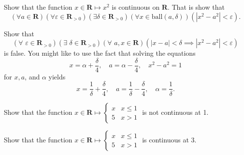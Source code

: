 \documentclass[12pt,answers,fleqn]{exam}
\newcommand{\reals}{\mathbf{R}}
\newcommand{\ball}{\mathrm{ball}}
\begin{document}
\begin{questions} 

\question[5] Show that the function $x \in \reals \mapsto x^2$ is continuous 
on $\reals$. That is show that
\begin{equation*}
    \left(\forall a \in \reals \right) 
    \left(\forall \varepsilon \in \reals_{>0} \right)
    \left(\exists \delta \in \reals_{>0} \right)
    \left(\forall x \in \ball(a,\delta) \right)
    \left(|x^2 - a^2| < \varepsilon \right).
\end{equation*}
\begin{solution}
    
\end{solution}


\question[5] Show that
\begin{equation*}
     \left(\forall \,\, \varepsilon \in \reals_{>0} \right)
    \left(\exists \,\, \delta \in \reals_{>0} \right)
    \left(\forall \,\, a, x \in \reals \right)
    \left(|x - a| < \delta \implies |x^2 - a^2| < \varepsilon \right)
\end{equation*}
is false.  You might like to use the fact that solving the equations
\begin{equation*}
     x = \alpha + \frac{\delta}{4}, \quad a = \alpha - \frac{\delta}{4},
     \quad x^2 - a^2 = 1
\end{equation*}
for $x,a$, and $\alpha$ yields
\begin{equation*}
    x = \frac{1}{\delta} + \frac{\delta}{4}, \quad 
    a =  \frac{1}{\delta} - \frac{\delta}{4}, \quad
    \alpha =  \frac{1}{\delta}.
\end{equation*}
\begin{solution}
    
\end{solution}
\question[5] Show that the function $x \in \reals \mapsto 
\begin{cases} x & x \leq 1 \\ 5 & x > 1 \end{cases}$ is not continuous at 1.
\begin{solution}
    
\end{solution}
\question[5] Show that the function $x \in \reals \mapsto 
\begin{cases} x & x \leq 1 \\ 5 & x > 1 \end{cases}$ is continuous at 3.
\end{questions}
\begin{solution}
    
\end{solution}
\end{document}
